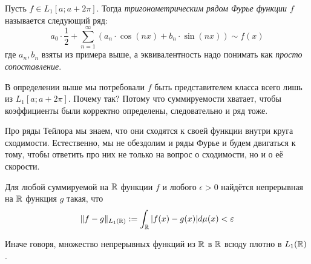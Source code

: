\begin{definition}
	Пусть $f \in L_1[a; a + 2\pi]$. Тогда \textit{тригонометрическим рядом Фурье функции $f$} называется следующий ряд:
	\[
		a_0 \cdot \frac{1}{2} + \sum_{n = 1}^\infty (a_n \cdot \cos(nx) + b_n \cdot \sin(nx)) \sim f(x)
	\]
	где $a_n, b_n$ взяты из примера выше, а эквивалентность надо понимать как \textit{просто сопоставление}.
\end{definition}

\begin{note}
	В определении выше мы потребовали $f$ быть представителем класса всего лишь из $L_1[a; a + 2\pi]$. Почему так? Потому что суммируемости хватает, чтобы коэффициенты были корректно определены, следовательно и ряд тоже.
\end{note}

Про ряды Тейлора мы знаем, что они сходятся к своей функции внутри круга сходимости. Естественно, мы не обездолим и ряды Фурье и будем двигаться к тому, чтобы ответить про них не только на вопрос о сходимости, но и о её скорости.

\begin{lemma} \label{continuous_denseness}
	Для любой суммируемой на $\mathbb{R}$ функции $f$ и любого $\epsilon > 0$ найдётся непрерывная на $\mathbb{R}$ функция $g$ такая, что
	\[
		\|f - g\|_{L_1(\mathbb{R})} := \int_{\mathbb{R}} |f(x) - g(x)| d\mu(x) < \varepsilon
	\]
\end{lemma}

\begin{note}
	Иначе говоря, множество непрерывных функций из $\mathbb{R}$ в $\mathbb{R}$ всюду плотно в $L_1(\mathbb{R})$.
\end{note}

